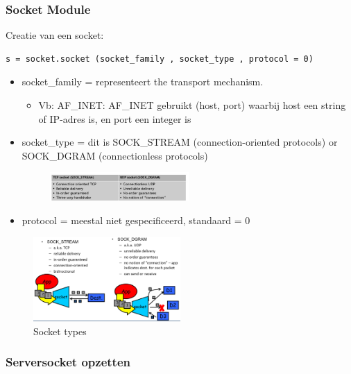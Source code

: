 \documentclass{article}
\begin{document}
\subsubsection{Socket Module}

Creatie van een socket:

\begin{verbatim}
s = socket.socket (socket_family , socket_type , protocol = 0)
\end{verbatim}

\begin{itemize}
    \item socket\_family = representeert the transport mechanism.
    \begin{itemize}
        \item Vb: AF\_INET: AF\_INET gebruikt (host, port) waarbij host een string of IP-adres is, en port een integer is
    \end{itemize}
    \item socket\_type = dit is SOCK\_STREAM (connection-oriented protocols) or SOCK\_DGRAM (connectionless protocols)
    \begin{figure}[H]
        \centering
        \includegraphics[width=0.5\textwidth]{socket-type.png}
    \end{figure}
    \item protocol = meestal niet gespecificeerd, standaard = 0    
\end{itemize}


\begin{figure}[H]
    \centering
    \includegraphics[width=0.5\textwidth]{socket-module.png}
    \caption{Socket types}
\end{figure}


\subsubsection{Serversocket opzetten}
\end{document}
